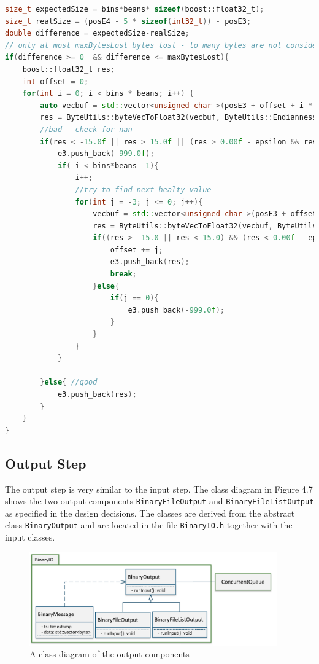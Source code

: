 \begin{lstlisting}[language=C++, caption=Code snippet from the repair function finding missing bytes.]
size_t expectedSize = bins*beans* sizeof(boost::float32_t);
size_t realSize = (posE4 - 5 * sizeof(int32_t)) - posE3;
double difference = expectedSize-realSize;
// only at most maxBytesLost bytes lost - to many bytes are not considered
if(difference >= 0  && difference <= maxBytesLost){
    boost::float32_t res;
    int offset = 0;
    for(int i = 0; i < bins * beans; i++) {
        auto vecbuf = std::vector<unsigned char >(posE3 + offset + i * 4, posE3 + offset + i * 4 + 4);
        res = ByteUtils::byteVecToFloat32(vecbuf, ByteUtils::Endianness::LittleEndian);
        //bad - check for nan
        if(res < -15.0f || res > 15.0f || (res > 0.00f - epsilon && res < 0.00f + epsilon) || res != res) {
            e3.push_back(-999.0f);
            if( i < bins*beans -1){
                i++;
                //try to find next healty value
                for(int j = -3; j <= 0; j++){
                    vecbuf = std::vector<unsigned char >(posE3 + offset + j + i * 4, posE3 + offset + j + i * 4 + 4);
                    res = ByteUtils::byteVecToFloat32(vecbuf, ByteUtils::Endianness::LittleEndian);
                    if((res > -15.0 || res < 15.0) && (res < 0.00f - epsilon || res > 0.00f + epsilon)){
                        offset += j;
                        e3.push_back(res);
                        break;
                    }else{
                        if(j == 0){
                            e3.push_back(-999.0f);
                        }
                    }
                }
            }

        }else{ //good
            e3.push_back(res);
        }
    }
}
\end{lstlisting}

\pagebreak

\subsection{Output Step}
The output step is very similar to the input step. The class diagram in Figure 4.7 shows the two output components \texttt{BinaryFileOutput} and \texttt{BinaryFileListOutput} as specified in the design decisions. The classes are derived from the abstract class \texttt{BinaryOutput} and are located in the file \texttt{BinaryIO.h} together with the input classes.

\vspace{3em}
\begin{figure}[!ht]
\centering
      \includegraphics[width=0.95\textwidth]{output}
        \caption{A class diagram of the output components}
\end{figure}
\vspace{3em}

